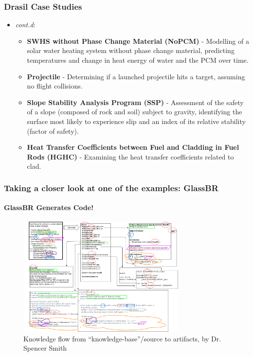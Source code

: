 \documentclass{beamer}
\begin{document}
\begin{frame}
    \frametitle{Drasil Case Studies}
    \begin{itemize}
        \item<1-> \emph{cont.d}\footnotemark[1]:
            \begin{itemize}
                \item<1-> \textbf{SWHS without Phase Change Material (NoPCM)} - Modelling of a solar water heating system without phase change material, predicting temperatures and change in heat energy of water and the PCM over time.
                \item<2-> \textbf{Projectile} - Determining if a launched projectile hits a target, assuming no flight collisions.
                \item<3-> \textbf{Slope Stability Analysis Program (SSP)} - Assessment of the safety of a slope (composed of rock and soil) subject to gravity, identifying the surface most likely to experience slip and an index of its relative stability (factor of safety).
                \item<4-> \textbf{Heat Transfer Coefficients between Fuel and Cladding in Fuel Rods (HGHC)} - Examining the heat transfer coefficients related to clad.
            \end{itemize}
    \end{itemize}


\end{frame}

\begin{frame}
    \frametitle{Taking a closer look at one of the examples: GlassBR}
    \framesubtitle{GlassBR Generates Code!}
    \begin{figure}
        \center
        \includegraphics[width=0.75\textwidth]{assets/DrasilSupportsChange.png}
        \caption{Knowledge flow from ``knowledge-base''/source to artifacts, by Dr. Spencer Smith}
        \label{fig:glassbr}
    \end{figure}
\end{frame}
\end{document}
